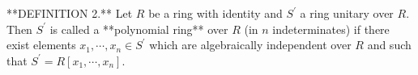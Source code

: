 **DEFINITION 2.** Let $R$ be a ring with identity and $S^\prime$ a ring unitary over $R$. Then $S^\prime$ is called a **polynomial ring** over $R$ (in $n$ indeterminates) if there exist elements $x_1, \cdots, x_n \in S^\prime$ which are algebraically independent over $R$ and such that $S^\prime = R[x_1, \cdots, x_n]$.
